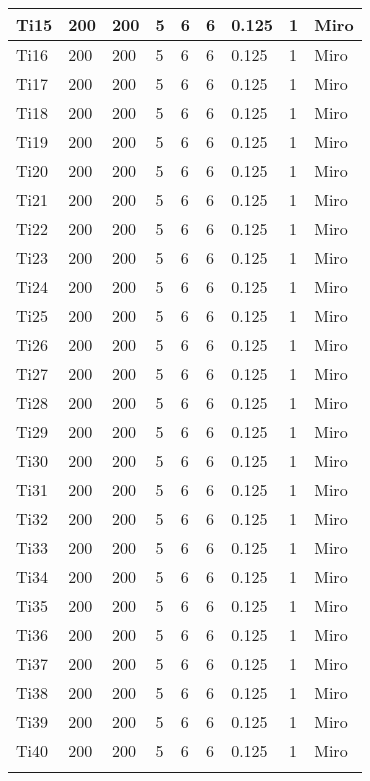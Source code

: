 \documentclass[10pt]{article}
\begin{document}
\begin{center}
\begin{tabular}{|l|l|l|l|l|l|l|l|l|}
\hline
Ti15 & 200 & 200 & 5 & 6 & 6 & 0.125 & 1 & Miro \\
\hline
Ti16 & 200 & 200 & 5 & 6 & 6 & 0.125 & 1 & Miro \\
\hline
Ti17 & 200 & 200 & 5 & 6 & 6 & 0.125 & 1 & Miro \\
\hline
Ti18 & 200 & 200 & 5 & 6 & 6 & 0.125 & 1 & Miro \\
\hline
Ti19 & 200 & 200 & 5 & 6 & 6 & 0.125 & 1 & Miro \\
\hline
Ti20 & 200 & 200 & 5 & 6 & 6 & 0.125 & 1 & Miro \\
\hline
Ti21 & 200 & 200 & 5 & 6 & 6 & 0.125 & 1 & Miro \\
\hline
Ti22 & 200 & 200 & 5 & 6 & 6 & 0.125 & 1 & Miro \\
\hline
Ti23 & 200 & 200 & 5 & 6 & 6 & 0.125 & 1 & Miro \\
\hline
Ti24 & 200 & 200 & 5 & 6 & 6 & 0.125 & 1 & Miro \\
\hline
Ti25 & 200 & 200 & 5 & 6 & 6 & 0.125 & 1 & Miro \\
\hline
Ti26 & 200 & 200 & 5 & 6 & 6 & 0.125 & 1 & Miro \\
\hline
Ti27 & 200 & 200 & 5 & 6 & 6 & 0.125 & 1 & Miro \\
\hline
Ti28 & 200 & 200 & 5 & 6 & 6 & 0.125 & 1 & Miro \\
\hline
Ti29 & 200 & 200 & 5 & 6 & 6 & 0.125 & 1 & Miro \\
\hline
Ti30 & 200 & 200 & 5 & 6 & 6 & 0.125 & 1 & Miro \\
\hline
Ti31 & 200 & 200 & 5 & 6 & 6 & 0.125 & 1 & Miro \\
\hline
Ti32 & 200 & 200 & 5 & 6 & 6 & 0.125 & 1 & Miro \\
\hline
Ti33 & 200 & 200 & 5 & 6 & 6 & 0.125 & 1 & Miro \\
\hline
Ti34 & 200 & 200 & 5 & 6 & 6 & 0.125 & 1 & Miro \\
\hline
Ti35 & 200 & 200 & 5 & 6 & 6 & 0.125 & 1 & Miro \\
\hline
Ti36 & 200 & 200 & 5 & 6 & 6 & 0.125 & 1 & Miro \\
\hline
Ti37 & 200 & 200 & 5 & 6 & 6 & 0.125 & 1 & Miro \\
\hline
Ti38 & 200 & 200 & 5 & 6 & 6 & 0.125 & 1 & Miro \\
\hline
Ti39 & 200 & 200 & 5 & 6 & 6 & 0.125 & 1 & Miro \\
\hline
Ti40 & 200 & 200 & 5 & 6 & 6 & 0.125 & 1 & Miro \\
\hline
 &  &  &  &  &  &  &  &  \\
\hline
\end{tabular}
\end{center}
\end{document}
